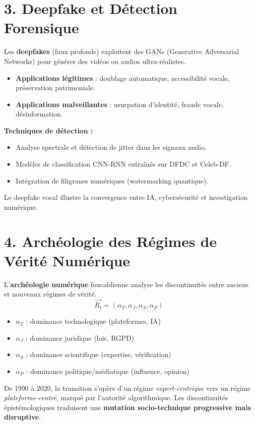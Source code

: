 \documentclass[12pt,a4paper]{article}
\begin{document}
\bigskip
\section*{3. Deepfake et Détection Forensique}
Les \textbf{deepfakes} (faux profonds) exploitent des GANs (Generative Adversarial Networks) pour générer des vidéos ou audios ultra-réalistes. 
\begin{itemize}[noitemsep]
  \item \textbf{Applications légitimes} : doublage automatique, accessibilité vocale, préservation patrimoniale.
  \item \textbf{Applications malveillantes} : usurpation d’identité, fraude vocale, désinformation.
\end{itemize}
\textbf{Techniques de détection :}
\begin{itemize}[noitemsep]
  \item Analyse spectrale et détection de jitter dans les signaux audio.
  \item Modèles de classification CNN-RNN entraînés sur DFDC et Celeb-DF.
  \item Intégration de filigranes numériques (watermarking quantique).
\end{itemize}
Le deepfake vocal illustre la convergence entre IA, cybersécurité et investigation numérique.

\bigskip
\section*{4. Archéologie des Régimes de Vérité Numérique}
L’\textbf{archéologie numérique} foucaldienne analyse les discontinuités entre anciens et nouveaux régimes de vérité. 
\[
\vec{R_t} = (\alpha_T, \alpha_J, \alpha_S, \alpha_P)
\]
\begin{itemize}[noitemsep]
  \item $\alpha_T$ : dominance technologique (plateformes, IA)
  \item $\alpha_J$ : dominance juridique (lois, RGPD)
  \item $\alpha_S$ : dominance scientifique (expertise, vérification)
  \item $\alpha_P$ : dominance politique/médiatique (influence, opinion)
\end{itemize}
De 1990 à 2020, la transition s’opère d’un régime \emph{expert-centrique} vers un régime \emph{plateforme-centré}, marqué par l’autorité algorithmique. Les discontinuités épistémologiques traduisent une \textbf{mutation socio-technique progressive mais disruptive}.
\end{document}
